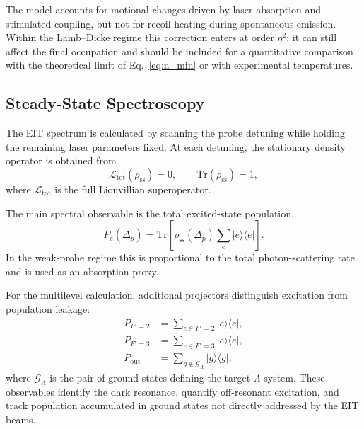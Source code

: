 The model accounts for motional changes driven by laser absorption and stimulated coupling, but not for recoil heating during spontaneous emission. Within the Lamb--Dicke regime this correction enters at order $\eta^2$; it can still affect the final occupation and should be included for a quantitative comparison with the theoretical limit of Eq.~\eqref{eq:n_min} or with experimental temperatures.
\subsection{Steady-State Spectroscopy}
\label{subsec:steady_state_spectroscopy}

The EIT spectrum is calculated by scanning the probe detuning while holding the remaining laser parameters fixed. At each detuning, the stationary density operator is obtained from
\begin{equation}
    \mathcal L_{\mathrm{tot}}(\rho_{\mathrm{ss}})=0,
    \qquad
    \mathrm{Tr}(\rho_{\mathrm{ss}})=1,
    \label{eq:steady_state_condition}
\end{equation}
where $\mathcal L_{\mathrm{tot}}$ is the full Liouvillian superoperator.

The main spectral observable is the total excited-state population,
\begin{equation}
    P_e(\Delta_p)
    =
    \mathrm{Tr}
    \left[
        \rho_{\mathrm{ss}}(\Delta_p)
        \sum_{e}
        |e\rangle\langle e|
    \right].
    \label{eq:excited_population_spectrum}
\end{equation}
In the weak-probe regime this is proportional to the total photon-scattering rate and is used as an absorption proxy.

For the multilevel calculation, additional projectors distinguish excitation from population leakage:
\begin{align}
    P_{F'=2}
    &=
    \sum_{e\in F'=2}
    |e\rangle\langle e|,
    \\
    P_{F'=3}
    &=
    \sum_{e\in F'=3}
    |e\rangle\langle e|,
    \\
    P_{\mathrm{out}}
    &=
    \sum_{g\notin\mathcal G_{\Lambda}}
    |g\rangle\langle g|,
    \label{eq:diagnostic_projectors}
\end{align}
where $\mathcal G_{\Lambda}$ is the pair of ground states defining the target $\Lambda$ system. These observables identify the dark resonance, quantify off-resonant excitation, and track population accumulated in ground states not directly addressed by the EIT beams.

